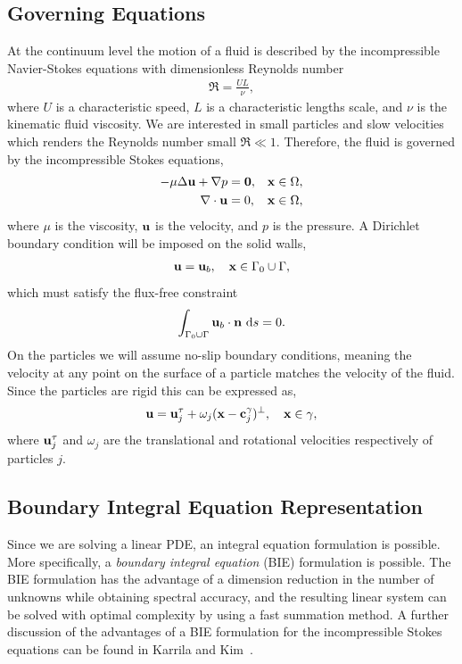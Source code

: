 \documentclass[preprint, 10pt]{elsarticle}
\begin{document}
\subsection{Governing Equations}\label{sec:governing}
At the continuum level the motion of a fluid is described by the
incompressible Navier-Stokes equations with dimensionless Reynolds
number
\begin{align*}
  \Re = \frac{UL}{\nu},
\end{align*}
where $U$ is a characteristic speed, $L$ is a characteristic lengths
scale, and $\nu$ is the kinematic fluid viscosity.  We are interested in
small particles and slow velocities which renders the Reynolds number
small $\Re \ll 1$.  Therefore, the fluid is governed by the
incompressible Stokes equations,
\begin{equation}
  \label{eq:stokes}
  \begin{aligned}
  -\mu\Delta \mathbf{u} + \nabla p &= \mathbf{0},
    &&{\mathbf{x}} \in \Omega, \\	  
  \nabla\cdot\mathbf{u} &= 0, && {\mathbf{x}} \in \Omega,
  \end{aligned}
\end{equation}
where $\mu$ is the viscosity, ${\mathbf{u}}$ is the velocity, and $p$ is the
pressure.  A Dirichlet boundary condition will be imposed on the solid
walls,
\begin{align}
  \label{eq:boundary_condition}
  \mathbf{u} = \mathbf{u}_b, \quad {\mathbf{x}} \in \Gamma_0\cup\Gamma,
\end{align}
which must satisfy the flux-free constraint 
\begin{align*}
  \int_{\Gamma_0\cup\Gamma} {\mathbf{u}}_b\cdot{\mathbf{n}}~\text{d}s = 0.
\end{align*}
On the particles we will assume no-slip boundary conditions, meaning the
velocity at any point on the surface of a particle matches the velocity
of the fluid.  Since the particles are rigid this can be expressed as,
\begin{align}
  \label{eq:particles_noslip}
  {\mathbf{u}} = {\mathbf{u}}^\tau_j + \omega_j({\mathbf{x}}-{\mathbf{c}}^\gamma_j)^\perp, \quad {\mathbf{x}} \in \gamma,
\end{align}
where ${\mathbf{u}}^\tau_j$ and $\omega_j$ are the translational and rotational velocities respectively of particles $j$.

\subsection{Boundary Integral Equation Representation}
Since we are solving a linear PDE, an integral equation formulation is
possible.  More specifically, a {\em boundary integral equation} (BIE)
formulation is possible.  The BIE formulation has the advantage of a
dimension reduction in the number of unknowns while obtaining spectral
accuracy, and the resulting linear system can be solved with optimal
complexity by using a fast summation method.  A further discussion of
the advantages of a BIE formulation for the incompressible Stokes
equations can be found in Karrila and Kim~\cite{Karrila1989}.
\end{document}
